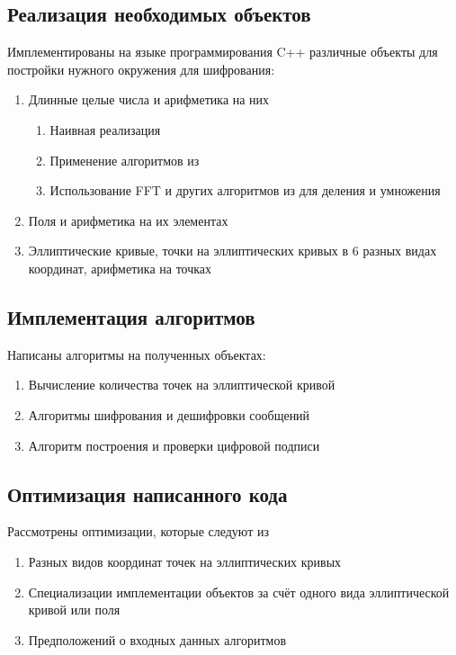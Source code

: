 \documentclass{article}
\begin{document}
\subsection*{Реализация необходимых объектов}
Имплементированы на языке программирования C++ различные объекты для постройки нужного окружения для шифрования:
\begin{enumerate}
  \item Длинные целые числа и арифметика на них
  \begin{enumerate}
    \item Наивная реализация
    \item Применение алгоритмов из \cite{knuth2014art} 
    \item Использование FFT и других алгоритмов из \cite{knuth2014artfmd} для деления и умножения 
  \end{enumerate}
  \item Поля и арифметика на их элементах
  \item Эллиптические кривые, точки на эллиптических кривых в 6 разных видах координат, арифметика на точках \cite{das2004guide}
\end{enumerate}

\subsection*{Имплементация алгоритмов}
Написаны алгоритмы на полученных объектах:
\begin{enumerate}
  \item Вычисление количества точек на эллиптической кривой \cite{kamarulhaili2012elliptic}
  \item Алгоритмы шифрования и дешифровки сообщений \cite{das2004guideprotocols}
  \item Алгоритм построения и проверки цифровой подписи \cite{das2004guideprotocols}
\end{enumerate}

\subsection*{Оптимизация написанного кода}
Рассмотрены оптимизации, которые следуют из
\begin{enumerate}
  \item Разных видов координат точек на эллиптических кривых\cite{vasilenko2008newcoord}
  \item Специализации имплементации объектов за счёт одного вида эллиптической кривой или поля\cite{adalier2015efficient}
  \item Предположений о входных данных алгоритмов\cite{das2004guideprotocols}
\end{enumerate}
\end{document}
